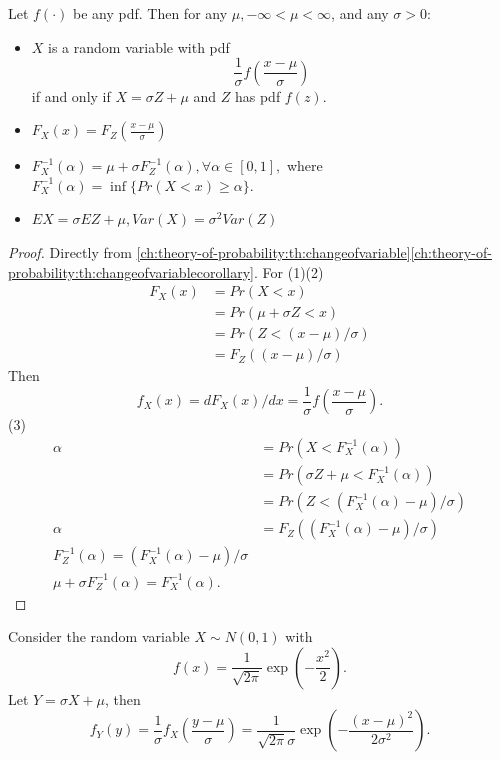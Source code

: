 \begin{refsection}
\begin{lemma}\cite[116]{casella2002statistical}\label{ch:theory-of-probability:th:locationScaleTransformation}
Let $f(\cdot)$ be any pdf. Then for any $\mu,-\infty< \mu < \infty$, and any $\sigma > 0$:
\begin{itemize}
    \item $X$ is a random variable with pdf $$\frac{1}{\sigma} f(\frac{x-\mu}{\sigma})$$ if and only if $X=\sigma Z + \mu$ and $Z$ has pdf $f(z)$.
    \item $F_X(x) = F_Z(\frac{x - \mu}{\sigma})$
    \item $F_X^{-1}(\alpha) = \mu + \sigma F_{Z}^{-1}(\alpha), \forall \alpha \in [0,1],$
    where $F^{-1}_X(\alpha) = \inf\{Pr(X < x )\geq \alpha \}$.
    \item $EX = \sigma EZ + \mu, Var(X) = \sigma^2 Var(Z)$ 
\end{itemize}
\end{lemma}
\begin{proof}
	Directly from \autoref{ch:theory-of-probability:th:changeofvariable}\autoref{ch:theory-of-probability:th:changeofvariablecorollary}. For (1)(2)
\begin{align*}
F_X(x) &= Pr(X < x) \\
		& = Pr(\mu + \sigma Z < x) \\
		& = Pr(Z < (x - \mu)/\sigma) \\
		& = F_Z((x - \mu)/\sigma)	
\end{align*}	 
Then
$$f_X(x) = dF_X(x)/dx = \frac{1}{\sigma} f(\frac{x-\mu}{\sigma}).$$
(3)
\begin{align*}
\alpha & = Pr(X < F_X^{-1}(\alpha)) \\
&= Pr(\sigma Z + \mu < F_X^{-1}(\alpha)) \\
&= Pr(Z < (F_X^{-1}(\alpha) - \mu)/\sigma) \\
\alpha &= F_Z((F_X^{-1}(\alpha) - \mu)/\sigma) \\
F_Z^{-1}(\alpha) = (F_X^{-1}(\alpha) - \mu)/\sigma \\
 \mu + \sigma F_{Z}^{-1}(\alpha) = F_X^{-1}(\alpha).
\end{align*}
\end{proof}

\begin{example}
Consider the random variable $X\sim N(0,1)$ with $$f(x) = \frac{1}{\sqrt{2\pi}}\exp(-\frac{x^2}{2}).$$
Let $Y = \sigma X + \mu$, then 
$$f_Y(y) = \frac{1}{\sigma} f_X(\frac{y-\mu}{\sigma}) = \frac{1}{\sqrt{2\pi}\sigma}\exp(-\frac{(x-\mu)^2}{2\sigma^2}).$$
\end{example}


\end{refsection}
